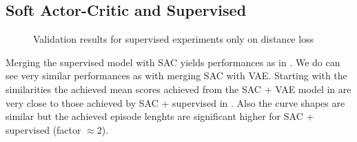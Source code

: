 \subsection{Soft Actor-Critic and Supervised}

\begin{figure}[h]
    \begin{center}
        \hfill
    \end{center}
    \caption[SAC + Supervised Distance Loss]{Validation results for supervised experiments only on distance loss}
    \label{fig:sac_supervised}
\end{figure}

Merging the supervised model with SAC yields performances as in . We do can see very similar performances as with merging SAC with VAE. Starting with the similarities the achieved mean scores achieved from the SAC + VAE model in  are very close to those achieved by SAC + supervised in . Also the curve shapes are similar but the achieved episode lenghts are significant higher for SAC + supervised (factor $\approx 2$).

